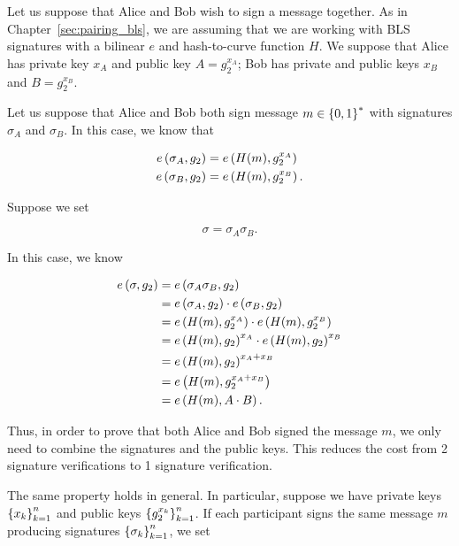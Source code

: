 Let us suppose that Alice and Bob wish to sign a message together.
As in Chapter~\ref{sec:pairing_bls}, we are assuming that we are working
with BLS signatures with a \gls{bilinear} $e$
and hash-to-curve function $H$.
We suppose that Alice has private key $x_{A}$ and
public key $A = g_{2}^{x_{A}}$;
Bob has private and public keys $x_{B}$ and $B = g_{2}^{x_{B}}$.

Let us suppose that Alice and Bob both sign message $m\in\left\{ 0,1 \right\}^{*}$
with signatures $\sigma_{A}$ and $\sigma_{B}$.
In this case, we know that

\begin{align}
    e\left( \sigma_{A}, g_{2} \right) &= e\left( H(m), g_{2}^{x_{A}} \right)
        \nonumber\\
    e\left( \sigma_{B}, g_{2} \right) &= e\left( H(m), g_{2}^{x_{B}} \right).
\end{align}

Suppose we set

\begin{equation}
    \sigma = \sigma_{A}\sigma_{B}.
\end{equation}

\noindent
In this case, we know

\begin{align}
    e\left( \sigma, g_{2} \right) &= e\left( \sigma_{A}\sigma_{B}, g_{2} \right)
            \nonumber\\
        &= e\left( \sigma_{A}, g_{2} \right)\cdot e\left( \sigma_{B}, g_{2} \right)
            \nonumber\\
        &= e\left( H(m), g_{2}^{x_{A}} \right)\cdot e\left( H(m), g_{2}^{x_{B}} \right)
            \nonumber\\
        &= e\left( H(m), g_{2} \right)^{x_{A}}\cdot e\left( H(m), g_{2} \right)^{x_{B}}
            \nonumber\\
        &= e\left( H(m), g_{2} \right)^{x_{A}+x_{B}}
            \nonumber\\
        &= e\left( H(m), g_{2}^{x_{A}+x_{B}} \right)
            \nonumber\\
        &= e\left( H(m), A\cdot B \right).
\end{align}

\noindent
Thus, in order to prove that both Alice and Bob signed the message $m$,
we only need to combine the signatures and the public keys.
This reduces the cost from 2 signature verifications
to 1 signature verification.

The same property holds in general.
In particular, suppose we have private keys $\left\{ x_{k} \right\}_{k=1}^{n}$
and public keys $\left\{ g_{2}^{x_{k}} \right\}_{k=1}^{n}$.
If each participant signs the same message $m$ producing
signatures $\left\{ \sigma_{k} \right\}_{k=1}^{n}$,
we set

